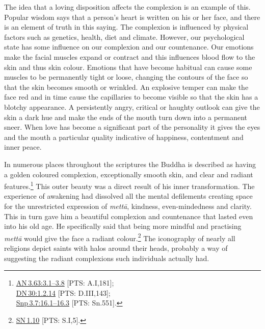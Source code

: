 \documentclass[10pt, openright]{book}
\begin{document}
The idea that a loving disposition affects the complexion is an example of this. Popular wisdom says that a person’s heart is written on his or her face, and there is an element of truth in this saying. The complexion is influenced by physical factors such as genetics, health, diet and climate. However, our psychological state has some influence on our complexion and our countenance. Our emotions make the facial muscles expand or contract and this influences blood flow to the skin and thus skin colour. Emotions that have become habitual can cause some muscles to be permanently tight or loose, changing the contours of the face so that the skin becomes smooth or wrinkled. An explosive temper can make the face red and in time cause the capillaries to become visible so that the skin has a blotchy appearance. A persistently angry, critical or haughty outlook can give the skin a dark hue and make the ends of the mouth turn down into a permanent sneer. When love has become a significant part of the personality it gives the eyes and the mouth a particular quality indicative of happiness, contentment and inner peace.


In numerous places throughout the scriptures the Buddha is described as having a golden coloured complexion, exceptionally smooth skin, and clear and radiant features.\footnote {\href{https://suttacentral.net/an3.63/en/sujato\#3.1}{AN 3.63:3.1–3.8} [PTS: A.I,181];\\
\href{https://suttacentral.net/dn30/en/sujato\#1.2.14}{DN 30:1.2.14} [PTS: D.III,143];\\
\href{https://suttacentral.net/snp3.7/en/sujato\#16.1}{Snp 3.7:16.1–16.3} [PTS: Sn.551].} This outer beauty was a direct result of his inner transformation. The experience of awakening had dissolved all the mental defilements creating space for the unrestricted expression of \textit{mettā}, kindness, even-mindedness and clarity. This in turn gave him a beautiful complexion and countenance that lasted even into his old age. He specifically said that being more mindful and practising \textit{mettā} would give the face a radiant colour.\footnote {\href{https://suttacentral.net/sn1.10/en/sujato}{SN 1.10} [PTS: S.I,5].} The iconography of nearly all religions depict saints with halos around their heads, probably a way of suggesting the radiant complexions such individuals actually had.
\end{document}
